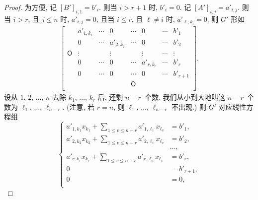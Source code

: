 \documentclass[../libro.tex]{subfiles}
\begin{document}
\begin{proof}
    为方便, 记 \([B']_{i,1} = b'_i\).
    则当 \(i > r + 1\) 时, \(b'_i = 0\).
    记 \([A']_{i,j} = a'_{i,j}\).
    则当 \(i > r\), 且 \(j \leq n\) 时,
    \(a'_{i,j} = 0\),
    且当 \(i \leq r\), 且 \(\ell \neq i\) 时,
    \(a'_{\ell,k_i} = 0\).
    则 \(G'\) 形如
    \begin{align*}
        \begin{bmatrix}
            {}         & a'_{1,k_1} & \cdots & 0          & \cdots     & 0          & \cdots & b'_1     \\
            {}         & 0          & \cdots & a'_{2,k_2} & \cdots     & 0          & \cdots & b'_2     \\
            \mathsf{O} & \vdots     & {}     & \vdots     & {}         & \vdots     & \cdots & \vdots   \\
            {}         & 0          & \cdots & 0          & \cdots     & a'_{r,k_r} & \cdots & b'_r     \\
            {}         & 0          & \cdots & 0          & \cdots     & 0          & \cdots & b'_{r+1} \\
            {}         & {}         & {}     & {}         & \mathsf{O} & {}         & {}     & {}       \\
        \end{bmatrix}.
    \end{align*}
    设从 \(1\), \(2\), \(\dots\), \(n\)
    去除 \(k_1\), \(\dots\), \(k_r\) 后,
    还剩 \(n - r\)~个数.
    我们从小到大地叫这 \(n - r\)~个数为
    \(\ell_1\), \(\dots\), \(\ell_{n-r}\).
    (注意, 若 \(r = n\), 则
    \(\ell_1\), \(\dots\), \(\ell_{n-r}\) 不出现.)
    则 \(G'\) 对应线性方程组
    \begin{equation}
        \left\{ %
        \begin{aligned}
            a'_{1,k_1} x_{k_1} + \sum_{1 \leq v \leq n-r} {a'_{1,\ell_v} x_{\ell_v}} & = b'_1,     \\
            a'_{2,k_2} x_{k_2} + \sum_{1 \leq v \leq n-r} {a'_{2,\ell_v} x_{\ell_v}} & = b'_2,     \\
            & \dots, \\
            a'_{r,k_r} x_{k_r} + \sum_{1 \leq v \leq n-r} {a'_{r,\ell_v} x_{\ell_v}} & = b'_r,     \\
            0                                                                        & = b'_{r+1}, \\
            0                                                                        & = 0,        \\

\end{aligned}
\end{equation}
\end{proof}
\end{document}
